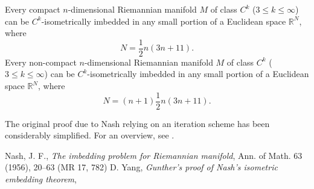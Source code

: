 \documentclass[12pt]{article}
\begin{document}
Every compact $n$-dimensional Riemannian manifold $M$ of class $C^k$ 
($3\le k\le\infty$) can be $C^k$-isometrically imbedded in any small 
portion of a Euclidean space $\mathbb R^N$, where 
$$
  N=\frac 12 n(3n+11).
$$ 
Every non-compact $n$-dimensional Riemannian manifold $M$ of class $C^k$ ($3\le k\le\infty$) can be $C^k$-isometrically imbedded in any small portion of a Euclidean space $\mathbb R^N$, where 
$$
  N=(n+1)\frac 12 n(3n+11).
$$

The original proof due to Nash relying on an iteration scheme has been considerably simplified. For an overview, see \cite{nashsim}. 


\begin{thebibliography}{9}
 Nash, J. F., \emph{The imbedding problem for Riemannian manifold}, Ann. of Math. 63 (1956), 20--63 (MR 17, 782)
 D. Yang, \emph{Gunther's proof of Nash's isometric embedding theorem}, 
\end{thebibliography}
\end{document}
